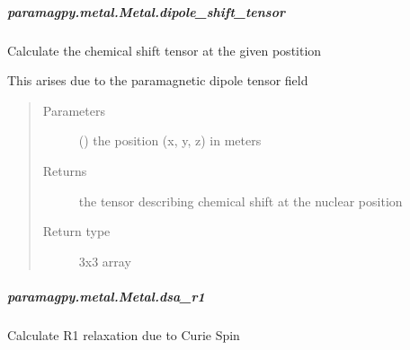 \documentclass[a4paper,10pt,english,openany,oneside]{sphinxmanual}
\begin{document}
\begin{fulllineitems}
\begin{fulllineitems}
\begin{fulllineitems}
\end{fulllineitems}



\subparagraph{paramagpy.metal.Metal.dipole\_shift\_tensor}
\label{\detokenize{reference/generated/paramagpy.metal.Metal.dipole_shift_tensor:paramagpy-metal-metal-dipole-shift-tensor}}\label{\detokenize{reference/generated/paramagpy.metal.Metal.dipole_shift_tensor::doc}}

\begin{fulllineitems}
\label{\detokenize{reference/generated/paramagpy.metal.Metal.dipole_shift_tensor:paramagpy.metal.Metal.dipole_shift_tensor}}
\sphinxAtStartPar
Calculate the chemical shift tensor at the given postition

\sphinxAtStartPar
This arises due to the paramagnetic dipole tensor field
\begin{quote}\begin{description}
\item[{Parameters}] \leavevmode
\sphinxAtStartPar
{} () \textendash{} the position (x, y, z) in meters

\item[{Returns}] \leavevmode
\sphinxAtStartPar
{} \textendash{} the tensor describing chemical shift at the nuclear position

\item[{Return type}] \leavevmode
\sphinxAtStartPar
3x3 array

\end{description}\end{quote}

\end{fulllineitems}



\subparagraph{paramagpy.metal.Metal.dsa\_r1}
\label{\detokenize{reference/generated/paramagpy.metal.Metal.dsa_r1:paramagpy-metal-metal-dsa-r1}}\label{\detokenize{reference/generated/paramagpy.metal.Metal.dsa_r1::doc}}

\begin{fulllineitems}
\label{\detokenize{reference/generated/paramagpy.metal.Metal.dsa_r1:paramagpy.metal.Metal.dsa_r1}}
\sphinxAtStartPar
Calculate R1 relaxation due to Curie Spin


\end{fulllineitems}
\end{fulllineitems}
\end{fulllineitems}
\end{document}
